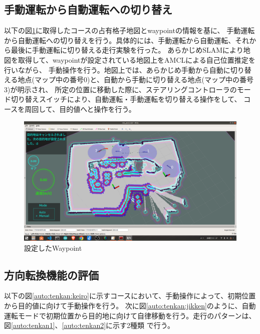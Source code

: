 \subsection{手動運転から自動運転への切り替え}
以下の図\ref{auto:jikken:waypoint}に取得したコースの占有格子地図とwaypointの情報を基に、
手動運転から自動運転への切り替えを行う。具体的には、手動運転から自動運転、それから最後に手動運転に切り替える走行実験を行った。
あらかじめSLAMにより地図を取得して、waypointが設定されている地図上をAMCLによる自己位置推定を行いながら、
手動操作を行う。地図上では、あらかじめ手動から自動に切り替える地点(マップ中の番号0)と、自動から手動に切り替える地点(マップ中の番号3)が明示され、
所定の位置に移動した際に、ステアリングコントローラのモード切り替えスイッチにより、自動運転・手動運転を切り替える操作をして、
コースを周回して、目的値へと操作を行う。

\begin{figure}
  \begin{center}
    \includegraphics[width=.8\linewidth]{img/auto_49.png}
    \caption{設定したWaypoint}
    \label{auto:jikken:waypoint}
  \end{center}
\end{figure}

\subsection{方向転換機能の評価}
以下の図\ref{auto:tenkan:keiro}に示すコースにおいて、手動操作によって、初期位置から目的値に向けて手動操作を行う。
次に図\ref{auto:tenkan:jikken}のように、自動運転モードで初期位置から目的地に向けて自律移動を行う。走行のパターンは、図\ref{auto:tenkan1}、\ref{auto:tenkan2}に示す2種類
で行う。

